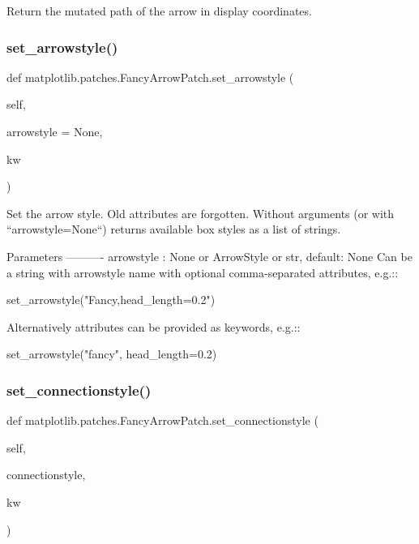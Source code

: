 \begin{DoxyVerb}Return the mutated path of the arrow in display coordinates.\end{DoxyVerb}
 \mbox{\label{classmatplotlib_1_1patches_1_1FancyArrowPatch_a123de11919e7b89dc5ae897996b973df}} 
\subsubsection{\texorpdfstring{set\+\_\+arrowstyle()}{set\_arrowstyle()}}
{\footnotesize\ttfamily def matplotlib.\+patches.\+Fancy\+Arrow\+Patch.\+set\+\_\+arrowstyle (\begin{DoxyParamCaption}\item[{}]{self,  }\item[{}]{arrowstyle = {\ttfamily None},  }\item[{}]{kw }\end{DoxyParamCaption})}

\begin{DoxyVerb}Set the arrow style. Old attributes are forgotten. Without arguments
(or with ``arrowstyle=None``) returns available box styles as a list of
strings.

Parameters
----------
arrowstyle : None or ArrowStyle or str, default: None
    Can be a string with arrowstyle name with optional comma-separated
    attributes, e.g.::

set_arrowstyle("Fancy,head_length=0.2")

    Alternatively attributes can be provided as keywords, e.g.::

set_arrowstyle("fancy", head_length=0.2)\end{DoxyVerb}
 \mbox{\label{classmatplotlib_1_1patches_1_1FancyArrowPatch_ad8bba70a6285d1b93ac062804b807a9e}} 
\subsubsection{\texorpdfstring{set\+\_\+connectionstyle()}{set\_connectionstyle()}}
{\footnotesize\ttfamily def matplotlib.\+patches.\+Fancy\+Arrow\+Patch.\+set\+\_\+connectionstyle (\begin{DoxyParamCaption}\item[{}]{self,  }\item[{}]{connectionstyle,  }\item[{}]{kw }\end{DoxyParamCaption})}

